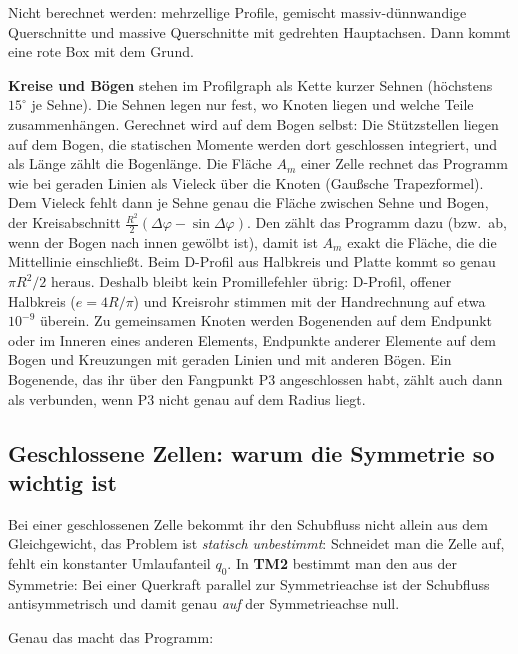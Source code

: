 Nicht berechnet werden: mehrzellige Profile, gemischt massiv-dünnwandige Querschnitte und massive
Querschnitte mit gedrehten Hauptachsen. Dann kommt eine rote Box mit dem Grund.

\textbf{Kreise und Bögen} stehen im Profilgraph als Kette kurzer Sehnen (höchstens $15^\circ$ je
Sehne). Die Sehnen legen nur fest, wo Knoten liegen und welche Teile zusammenhängen. Gerechnet wird
auf dem Bogen selbst: Die Stützstellen liegen auf dem Bogen, die statischen Momente werden dort
geschlossen integriert, und als Länge zählt die Bogenlänge. Die Fläche $A_m$ einer Zelle rechnet
das Programm wie bei geraden Linien als Vieleck über die Knoten (Gaußsche Trapezformel). Dem
Vieleck fehlt dann je Sehne genau die Fläche zwischen Sehne und Bogen, der Kreisabschnitt
$\frac{R^2}{2}(\Delta\varphi - \sin\Delta\varphi)$. Den zählt das Programm dazu (bzw.\ ab, wenn der
Bogen nach innen gewölbt ist), damit ist $A_m$ exakt die Fläche, die die Mittellinie einschließt.
Beim D-Profil aus Halbkreis und Platte kommt so genau $\pi R^2/2$ heraus.
Deshalb bleibt kein Promillefehler übrig: D-Profil,
offener Halbkreis ($e = 4R/\pi$) und Kreisrohr stimmen mit der Handrechnung auf etwa $10^{-9}$ überein.
Zu gemeinsamen Knoten werden Bogenenden auf dem Endpunkt oder im Inneren eines anderen Elements,
Endpunkte anderer Elemente auf dem Bogen und Kreuzungen mit geraden Linien und mit anderen Bögen. Ein
Bogenende, das ihr über den Fangpunkt P3 angeschlossen habt, zählt auch dann als verbunden, wenn P3
nicht genau auf dem Radius liegt.

\subsection{Geschlossene Zellen: warum die Symmetrie so wichtig ist}

Bei einer geschlossenen Zelle bekommt ihr den Schubfluss nicht allein aus dem Gleichgewicht, das Problem ist \emph{statisch unbestimmt}:
Schneidet man die Zelle auf, fehlt ein konstanter Umlaufanteil $q_0$. In \textbf{TM2} bestimmt
man den aus der Symmetrie: Bei einer Querkraft parallel zur Symmetrieachse ist der Schubfluss
antisymmetrisch und damit genau \emph{auf} der Symmetrieachse null.

Genau das macht das Programm:

